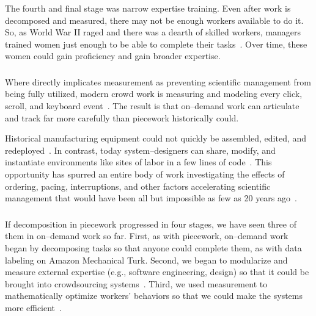 \documentclass[trackingWork]{subfiles}
\begin{document}
The fourth and final stage was narrow expertise training. 
Even after work is decomposed and measured, there may not be enough workers available to do it. 
So, as World War II raged and there was a dearth of skilled workers, managers trained women just enough to be able to complete their tasks~\cite{hart2013rise}. 
Over time, these women could gain proficiency and gain broader expertise.



\subsubsection{\whatchanged}
\begin{comment}
outline
	- measurement is more precise,
  so decomposition is deeper
	- not a single position,
  but a marketplace
\end{comment}

Where \citeauthor{10.2307/23702539} directly implicates measurement as
preventing scientific management from being fully utilized,
modern crowd work is measuring and modeling every click,
scroll,
and keyboard event~\cite{rzeszotarski2011instrumenting,rzeszotarski2012crowdscape}.
The result is that on--demand work can articulate and track far more carefully than piecework historically could.


Historical manufacturing equipment could not quickly be assembled,
edited,
and redeployed~\cite{hu1961parallel}.
In contrast,
today system--designers can share,
modify,
and instantiate environments
like sites of labor in a few lines of code~\cite{lessig2006code,turkitLittle}.
This opportunity has spurred an entire body of work investigating the effects of
ordering,
pacing,
interruptions,
and
other factors accelerating scientific management that would have been
all but impossible as few as 20 years ago~\cite{dai2015and,Cai:2016:CRI:2858036.2858237,cheng2015break,measuringCrowdsourcingCheng,embracingErrorKrishna}.


\subsubsection{\implication}
If decomposition in piecework progressed in four stages, we have seen three of them in on--demand work so far.
First, as with piecework, on--demand work began by decomposing tasks so that anyone could complete them, as with data labeling on Amazon Mechanical Turk.
Second, we began to modularize and measure external expertise (e.g., software engineering, design) so that it could be brought into crowdsourcing systems~\cite{foundry,Chen2016}.
Third, we used measurement to mathematically optimize workers' behaviors so that we could make the systems more efficient~\cite{weld2010decision}.
\end{document}
